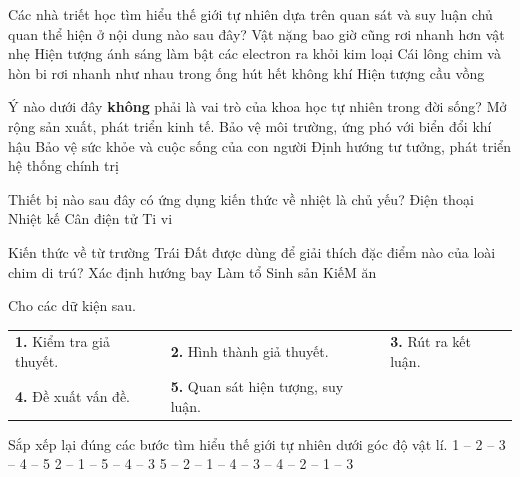 \begin{ex}
	Các nhà triết học tìm hiểu thế giới tự nhiên dựa trên quan sát và suy luận chủ quan thể hiện ở nội dung nào sau đây?\choice
	{\True Vật nặng bao giờ cũng rơi nhanh hơn vật nhẹ}
	{Hiện tượng ánh sáng làm bật các electron ra khỏi kim loại}
	{Cái lông chim và hòn bi rơi nhanh như nhau trong ống hút hết không khí}
	{Hiện tượng cầu vồng}
\end{ex}


\begin{ex}
	Ý nào dưới đây \textbf{không} phải là vai trò của khoa học tự nhiên trong đời sống?\choice
	{Mở rộng sản xuất, phát triển kinh tế.}
	{Bảo vệ môi trường, ứng phó với biển đổi khí hậu}
	{Bảo vệ sức khỏe và cuộc sống của con người}
	{\True Định hướng tư tưởng, phát triển hệ thống chính trị}
\end{ex}

\begin{ex}
	Thiết bị nào sau đây có ứng dụng kiến thức về nhiệt là chủ yếu?\choice
	{Điện thoại}
	{\True Nhiệt kế}
	{Cân điện tử}
	{Ti vi}
\end{ex}

\begin{ex}
	Kiến thức về từ trường Trái Đất được dùng để giải thích đặc điểm nào của loài chim di trú? \choice
	{\True Xác định hướng bay}
	{Làm tổ}
	{Sinh sản}
	{KiếM ăn}
\end{ex}

\begin{ex} 
Cho các dữ kiện sau.\vspace{-1cm}
\begin{center}
	\begin{tabular}{L{7cm}L{7cm}L{7cm}}
		\textbf{1.} Kiểm tra giả thuyết.&\textbf{2.} Hình thành giả thuyết.&\textbf{3.} Rút ra kết luận.\\
		\textbf{4.} Đề xuất vấn đề.& \textbf{5.} Quan sát hiện tượng, suy luận.
	\end{tabular}
\end{center}
\vspace{-0.5cm}
Sắp xếp lại đúng các bước tìm hiểu thế giới tự nhiên dưới góc độ vật lí. \choice
	{1 – 2 – 3 – 4 – 5}
	{2 – 1 – 5 – 4 – 3}
	{5 – 2 – 1 – 4 – 3}
	{ – 4 – 2 – 1 – 3}
\end{ex}

